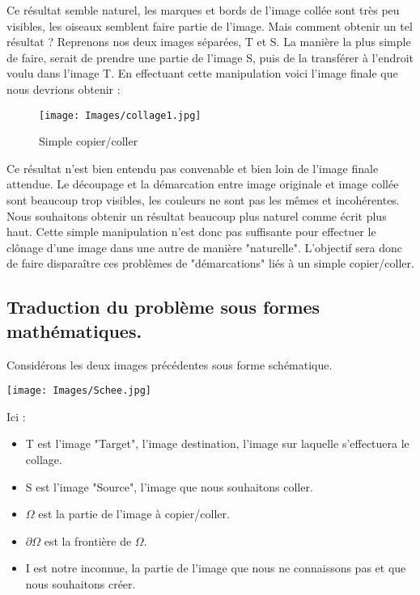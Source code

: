 \documentclass[10pt,a4paper]{article}
\begin{document}
Ce résultat semble naturel, les marques et bords de l'image collée sont très peu visibles, les oiseaux semblent faire partie de l'image.
Mais comment obtenir un tel résultat ? 
\newline
Reprenons nos deux images séparées, T et S.  La manière la plus simple de faire, serait de prendre une partie de l'image S,  puis de la transférer à l'endroit voulu dans l'image T. En effectuant cette manipulation voici l'image finale que nous devrions obtenir : 
\begin{center}
\begin{figure}[H]
     \centering
     \texttt{[image: Images/collage1.jpg]}
     \caption{Simple copier/coller}
\end{figure}
\end{center}

Ce résultat n'est bien entendu pas convenable et bien loin de l'image finale attendue. Le découpage et la démarcation entre image originale et image collée sont beaucoup trop visibles, les couleurs ne sont pas les mêmes et incohérentes. Nous souhaitons obtenir un résultat beaucoup plus naturel comme écrit plus haut. Cette simple manipulation n'est donc pas suffisante pour effectuer le clônage d'une image dans une autre de manière "naturelle". \newline
L'objectif sera donc de faire disparaître ces problèmes de "démarcations" liés à un simple copier/coller. 


\subsection{Traduction du problème sous formes mathématiques.}

Considérons les deux images précédentes sous forme schématique. 
\begin{center}
    \texttt{[image: Images/Schee.jpg]}
\end{center}

Ici : 
\begin{itemize}
    \item T est l'image "Target", l'image destination, l'image sur laquelle s'effectuera le collage. 
    \item S est l'image "Source", l'image que nous souhaitons coller.
    \item $\Omega$ est la partie de l'image à copier/coller.
    \item $\partial \Omega$ est la frontière de $\Omega$.
    \item I est notre inconnue, la partie de l'image que nous ne connaissons pas et que nous souhaitons créer.
\end{itemize}
\end{document}
